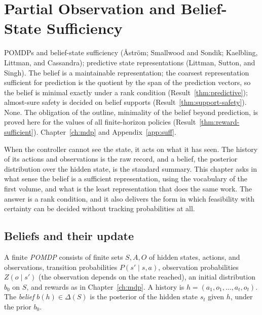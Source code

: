 \chapter{Partial Observation and Belief-State Sufficiency}\label{ch:pomdp}
{POMDPs and belief-state sufficiency (\r{A}str\"om; Smallwood and Sondik; Kaelbling, Littman, and Cassandra); predictive state representations (Littman, Sutton, and Singh).}
{The belief is a maintainable representation; the coarsest representation sufficient for prediction is the quotient by the span of the prediction vectors, so the belief is minimal exactly under a rank condition (Result~\ref{thm:predictive}); almost-sure safety is decided on belief supports (Result~\ref{thm:support-safety}).}
{None. The obligation of the outline, minimality of the belief beyond prediction, is proved here for the values of all finite-horizon policies (Result~\ref{thm:reward-sufficient}).}
{Chapter~\ref{ch:mdp} and Appendix~\ref{app:suff}.}

When the controller cannot see the state, it acts on what it has seen. The history of its actions and observations is the raw record, and a belief, the posterior distribution over the hidden state, is the standard summary. This chapter asks in what sense the belief is a sufficient representation, using the vocabulary of the first volume, and what is the least representation that does the same work. The answer is a rank condition, and it also delivers the form in which feasibility with certainty can be decided without tracking probabilities at all.

\section{Beliefs and their update}

\begin{definition}\label{def:pomdp}
A finite \emph{POMDP} consists of finite sets $S,A,O$ of hidden states, actions, and observations, transition probabilities $P(s'\mid s,a)$, observation probabilities $Z(o\mid s')$ (the observation depends on the state reached), an initial distribution $b_0$ on $S$, and rewards as in Chapter~\ref{ch:mdp}. A history is $h=(a_1,o_1,\dots,a_t,o_t)$. The \emph{belief} $b(h)\in\Delta(S)$ is the posterior of the hidden state $s_t$ given $h$, under the prior $b_0$.
\end{definition}

